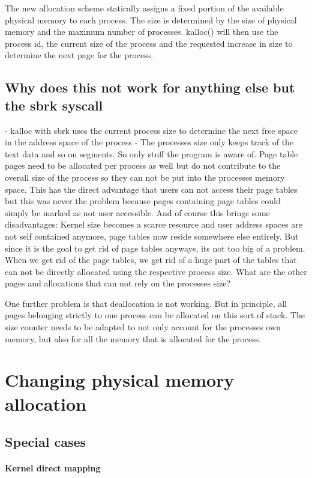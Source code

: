 The new allocation scheme statically assigns a fixed portion of the available physical memory
to each process. The size is determined by the size of physical memory and the maximum number
of processes.
kalloc() will then use the process id, the current size of the process and the requested
increase in size to determine the next page for the process.

\subsection*{Why does this not work for anything else but the sbrk syscall}
- kalloc with sbrk uses the current process size to determine the next free space in
the address space of the process
- The processes size only keeps track of the text data and so on segments. So only stuff
the program is aware of. Page table pages need to be allocated per process as well but
do not contribute to the overall size of the process so they can not be put into the
processes memory space. This has the direct advantage that users can not access their page tables
but this was never the problem because pages containing page tables could simply be marked
as not user accessible. And of course this brings some disadvantages: Kernel size becomes
a scarce resource and user address spaces are not self contained anymore, page tables now reside
somewhere else entirely.
But since it is the goal to get rid of page tables anyways, its not too big of a problem.
When we get rid of the page tables, we get rid of a huge part of the tables that can not
be directly allocated using the respective process size.
What are the other pages and allocations that can not rely on the processes size?

One further problem is that deallocation is not working. But in principle, all pages belonging
strictly to one process can be allocated on this sort of stack. The size counter
needs to be adapted to not only account for the processes own memory, but also
for all the memory that is allocated for the process.
\section{Changing physical memory allocation}
\subsection{Special cases}
\paragraph*{Kernel direct mapping}
